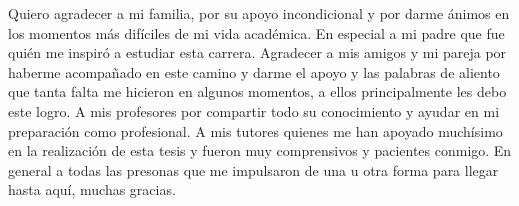 \begin{acknowledgements}
    Quiero agradecer a mi familia, por su apoyo incondicional y por darme ánimos en los momentos más difíciles de mi vida académica. En especial a mi padre que fue quién me inspiró a estudiar esta carrera. Agradecer a mis amigos y mi pareja por haberme acompañado en este camino y darme el apoyo y las palabras de aliento que tanta falta me hicieron en algunos momentos, a ellos principalmente les debo este logro. A mis profesores por compartir todo su conocimiento y ayudar en mi preparación como profesional. A mis tutores quienes me han apoyado muchísimo en la realización de esta tesis y fueron muy comprensivos y pacientes conmigo. En general a todas las presonas que me impulsaron de una u otra forma para llegar hasta aquí, muchas gracias.
\end{acknowledgements}